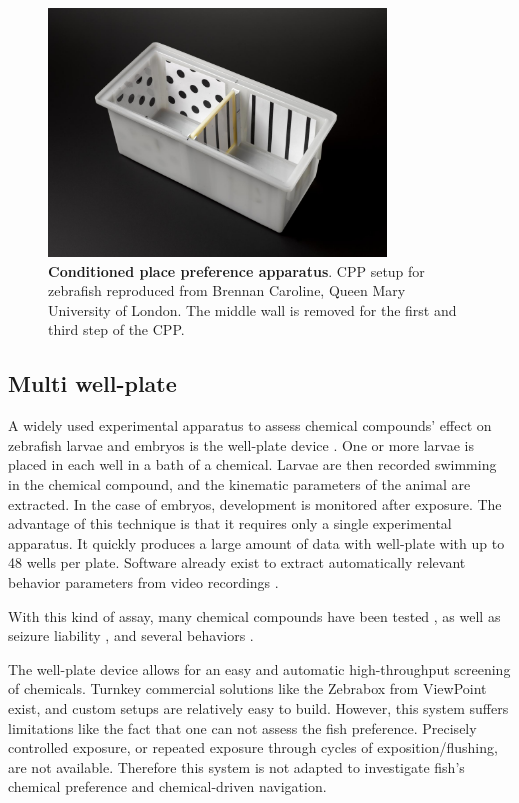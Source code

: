     \begin{figure}[h]
      \centering
      \includegraphics[width=0.8\textwidth]{part_2/assets/cpp.jpg}
      \caption{\textbf{Conditioned place preference apparatus}.  CPP setup for zebrafish reproduced from Brennan Caroline, Queen Mary University of London. The middle wall is removed for the first and third step of the CPP.}
      \label{cpp_schematic}
    \end{figure}

    \subsection{Multi well-plate}
    A widely used experimental apparatus to assess chemical compounds' effect on zebrafish larvae and embryos is the well-plate device \cite{rennekamp201515}. One or more larvae is placed in each well in a bath of a chemical. Larvae are then recorded swimming in the chemical compound, and the kinematic parameters of the animal are extracted. In the case of embryos, development is monitored after exposure. The advantage of this technique is that it requires only a single experimental apparatus. It quickly produces a large amount of data with well-plate with up to 48 wells per plate. Software already exist to extract automatically relevant behavior parameters from video recordings \cite{zhou2014quantification}.

    With this kind of assay, many chemical compounds have been tested \cite{sallinen2009mptp,rihel2010zebrafish,kokel2010rapid}, as well as seizure liability \cite{winter2008validation}, and several behaviors \cite{farrell2011evaluation, shen2020rapid,schnorr2012measuring,pelkowski2011novel}.

    The well-plate device allows for an easy and automatic high-throughput screening of chemicals. Turnkey commercial solutions like the Zebrabox from ViewPoint exist, and custom setups are relatively easy to build. However, this system suffers limitations like the fact that one can not assess the fish preference. Precisely controlled exposure, or repeated exposure through cycles of exposition/flushing, are not available. Therefore this system is not adapted to investigate fish's chemical preference and chemical-driven navigation.


